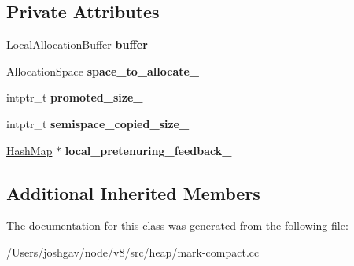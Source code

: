 \subsection*{Private Attributes}
\begin{DoxyCompactItemize}
\item 
\hyperlink{classv8_1_1internal_1_1_local_allocation_buffer}{Local\+Allocation\+Buffer} {\bfseries buffer\+\_\+}\hypertarget{classv8_1_1internal_1_1_mark_compact_collector_1_1_evacuate_new_space_visitor_a3adc6a31632a9d1261a5b4205a3f1bad}{}\label{classv8_1_1internal_1_1_mark_compact_collector_1_1_evacuate_new_space_visitor_a3adc6a31632a9d1261a5b4205a3f1bad}

\item 
Allocation\+Space {\bfseries space\+\_\+to\+\_\+allocate\+\_\+}\hypertarget{classv8_1_1internal_1_1_mark_compact_collector_1_1_evacuate_new_space_visitor_a0fc7c334ec6b47e14c9cca11b584a2d4}{}\label{classv8_1_1internal_1_1_mark_compact_collector_1_1_evacuate_new_space_visitor_a0fc7c334ec6b47e14c9cca11b584a2d4}

\item 
intptr\+\_\+t {\bfseries promoted\+\_\+size\+\_\+}\hypertarget{classv8_1_1internal_1_1_mark_compact_collector_1_1_evacuate_new_space_visitor_a10a2c635d769b5b551ecc8a3ebe75fd8}{}\label{classv8_1_1internal_1_1_mark_compact_collector_1_1_evacuate_new_space_visitor_a10a2c635d769b5b551ecc8a3ebe75fd8}

\item 
intptr\+\_\+t {\bfseries semispace\+\_\+copied\+\_\+size\+\_\+}\hypertarget{classv8_1_1internal_1_1_mark_compact_collector_1_1_evacuate_new_space_visitor_a1a9f0e081205b77aa49732e9e51cce2f}{}\label{classv8_1_1internal_1_1_mark_compact_collector_1_1_evacuate_new_space_visitor_a1a9f0e081205b77aa49732e9e51cce2f}

\item 
\hyperlink{classv8_1_1internal_1_1_template_hash_map_impl}{Hash\+Map} $\ast$ {\bfseries local\+\_\+pretenuring\+\_\+feedback\+\_\+}\hypertarget{classv8_1_1internal_1_1_mark_compact_collector_1_1_evacuate_new_space_visitor_a52d67c351d841b7d016a8d3b55e5a757}{}\label{classv8_1_1internal_1_1_mark_compact_collector_1_1_evacuate_new_space_visitor_a52d67c351d841b7d016a8d3b55e5a757}

\end{DoxyCompactItemize}
\subsection*{Additional Inherited Members}


The documentation for this class was generated from the following file\+:\begin{DoxyCompactItemize}
\item 
/\+Users/joshgav/node/v8/src/heap/mark-\/compact.\+cc\end{DoxyCompactItemize}
